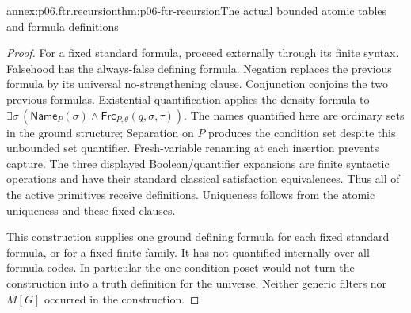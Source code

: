 \begin{annexitem}{annex:p06.ftr.recursion}{thm:p06-ftr-recursion}{The actual bounded atomic tables and formula definitions}
\begin{proof}
For a fixed standard formula, proceed externally through its finite
syntax. Falsehood has the always-false defining formula. Negation replaces
the previous formula by its universal no-strengthening clause. Conjunction
conjoins the two previous formulas. Existential quantification applies
the density formula to \(\exists\sigma\,(\mathsf{Name}_P(\sigma)\land
\mathsf{Frc}_{P,\theta}(q,\sigma,\bar\tau))\).
The names quantified here are ordinary sets in the ground structure;
Separation on \(P\) produces the condition set despite this unbounded
set quantifier. Fresh-variable renaming at each insertion prevents
capture. The three displayed Boolean/quantifier expansions are finite
syntactic operations and have their standard classical satisfaction
equivalences. Thus all of the active primitives receive definitions.
Uniqueness follows from the atomic uniqueness and these fixed clauses.

This construction supplies one ground defining formula for each fixed
standard formula, or for a fixed finite family. It has not quantified
internally over all formula codes. In particular the one-condition poset
would not turn the construction into a truth definition for the universe.
Neither generic filters nor \(M[G]\) occurred in the construction.
\end{proof}
\end{annexitem}

